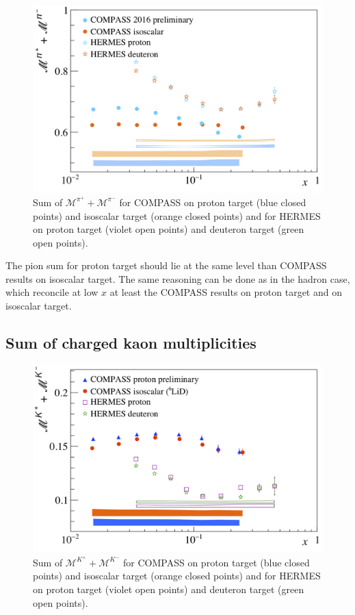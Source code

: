 \begin{figure}[!h]
  \centering
  \includegraphics[scale=0.5]{./gfx/pis.png}
  \caption{Sum of $\mathscr{M}^{\pi^+}+\mathscr{M}^{\pi^-}$ for COMPASS on proton target (blue closed points) and isoscalar target (orange closed points) and for HERMES on proton target (violet open points) and deuteron target (green open points).}
  \label{pic:pisum}
\end{figure}

The pion sum for proton target should lie at the same level than COMPASS results on isoscalar target. The same reasoning can be done as in the hadron case, which reconcile at low $x$ at least the COMPASS results on proton target and on isoscalar target.

\subsection{Sum of charged kaon multiplicities}

\begin{figure}[!h]
  \centering
  \includegraphics[scale=0.5]{./gfx/Ks.png}
  \caption{Sum of $\mathscr{M}^{K^+}+\mathscr{M}^{K^-}$ for COMPASS on proton target (blue closed points) and isoscalar target (orange closed points) and for HERMES on proton target (violet open points) and deuteron target (green open points).}
  \label{pic:ksum}
\end{figure}

